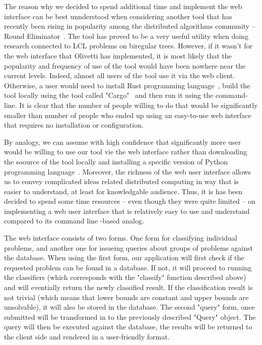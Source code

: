 The reason why we decided to spend additional time and implement
the web interface can be best unnderstood when considering
another tool that has recently been rising in popularity among
the distributed algorithms community -- Round Eliminator~\cite{Olivetti2020}. The tool has proved to be a very useful utility
when doing research connected to LCL problems on biregular trees.
However, if it wasn't for the web interface that Olivetti has
implemented, it is most likely that the popularity and
frequency of use of the tool would have been nowhere near the current
levels. Indeed, almost all users of the tool use it via the web
client. Otherwise, a user would need to install Rust programming
language~\cite{FIXME}, build the tool locally using the tool
called "Cargo"~\cite{FIXME} and then run it using the command-line.
It is clear that the number of people willing to do that would be
significantly smaller than number of people who ended up using
an easy-to-use web interface that requires no installation or 
configuration.

By analogy, we can assume with high confidence that significantly more
user would be willing to use our tool vie the web interface rather
than downloading the soource of the tool locally and installing
a specific version of Python programming language~\cite{FIXME}.
Moreover, the richness of the web user interface allows us to convey complicated
ideas related distributed computing in way that is easier to understand, at least for knowledgable audience. Thus, it is has been
decided to spend some time resources -- even though they were 
quite limited -- on implementing a web user interface that is
relatively easy to use and understand compared to its
command line -based analog.

The web interface consists of two forms. One form for classifying
individual problems, and another one for issueing queries
about groups of problems against the database. When using the
first form, our application will first check if the requested
problem can be found in a database. If not, it will proceed to
running the classifiers (which corresponds with the "classify" function described above) and will eventially return the newly
classified result. If the classification result is not trivial (which means that lower bounds are constant and upper bounds are unsolvable),
it will also be stored in the database. The second "query" form, once
submitted will be transformed in to the previously described
"Query" object. The query will then be executed against the database,
the results will be returned to the client side and rendered
in a user-friendly format.

